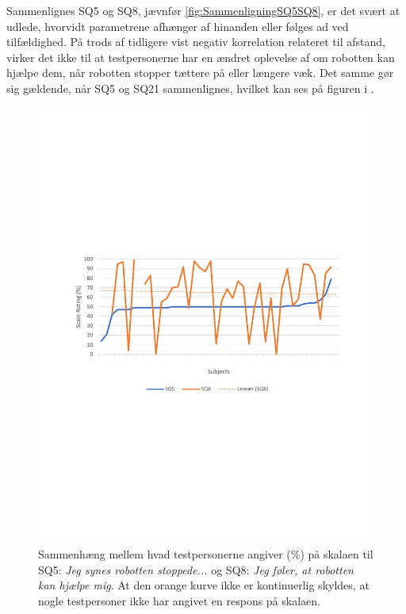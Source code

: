 Sammenlignes SQ5 og SQ8, jævnfør \autoref{fig:SammenligningSQ5SQ8}, er det svært at udlede, hvorvidt parametrene afhænger af hinanden eller følges ad ved tilfældighed. På trods af tidligere vist negativ korrelation relateret til afstand, virker det ikke til at testpersonerne har en ændret oplevelse af om robotten kan hjælpe dem, når robotten stopper tættere på eller længere væk. Det samme gør sig gældende, når SQ5 og SQ21 sammenlignes, hvilket kan ses på figuren i . 

\begin{figure}[H]
	\centering
	\includegraphics[width=\textwidth]{Figure/Korrelationsgrafer/SQ5+SQ8}
	\caption{Sammenhæng mellem hvad testpersonerne angiver (\%) på skalaen til SQ5: \textit{Jeg synes robotten stoppede...} og SQ8: \textit{Jeg føler, at robotten kan hjælpe mig}. At den orange kurve ikke er kontinuerlig skyldes, at nogle testpersoner ikke har angivet en respons på skalaen.}
	\label{fig:SammenligningSQ5SQ8}
\end{figure}

